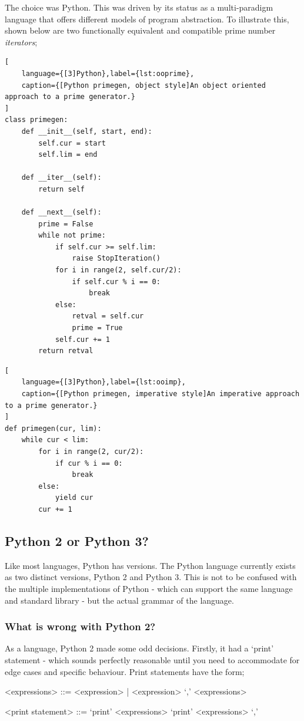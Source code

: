 \documentclass[10pt,a4paper,notitlepage]{report}
\begin{document}
The choice was Python. This was driven by its status as a multi-paradigm language that offers different models of program abstraction.
To illustrate this, shown below are two functionally equivalent and compatible prime number \emph{iterators};
\begin{lstlisting}[
	language={[3]Python},label={lst:ooprime},
	caption={[Python primegen, object style]An object oriented approach to a prime generator.}
]
class primegen:
    def __init__(self, start, end):
        self.cur = start
        self.lim = end

    def __iter__(self):
        return self

    def __next__(self):
        prime = False
        while not prime:
            if self.cur >= self.lim:
                raise StopIteration()
            for i in range(2, self.cur/2):
                if self.cur % i == 0:
                    break
            else:
                retval = self.cur
                prime = True
            self.cur += 1
        return retval
\end{lstlisting}

\begin{lstlisting}[
	language={[3]Python},label={lst:ooimp},
	caption={[Python primegen, imperative style]An imperative approach to a prime generator.}
]
def primegen(cur, lim):
    while cur < lim:
        for i in range(2, cur/2):
            if cur % i == 0:
                break
        else:
            yield cur
        cur += 1

\end{lstlisting}

\subsection{Python 2 or Python 3?}
Like most languages, Python has versions. The Python language currently exists as two distinct versions, Python 2 and Python 3. This is not to be confused with the multiple implementations of Python - which can support the same language and standard library - but the actual grammar of the language.

\subsubsection{What is wrong with Python 2?}
As a language, Python 2 made some odd decisions. Firstly, it had a `print' statement - which sounds perfectly reasonable until you need to accommodate for edge cases and specific behaviour. Print statements have the form;
\begin{grammar}
<expressions> ::= <expression> | <expression> `,' <expressions>

<print statement> ::= `print' <expressions>
\alt `print' <expressions> `,'
\end{grammar}
\end{document}
